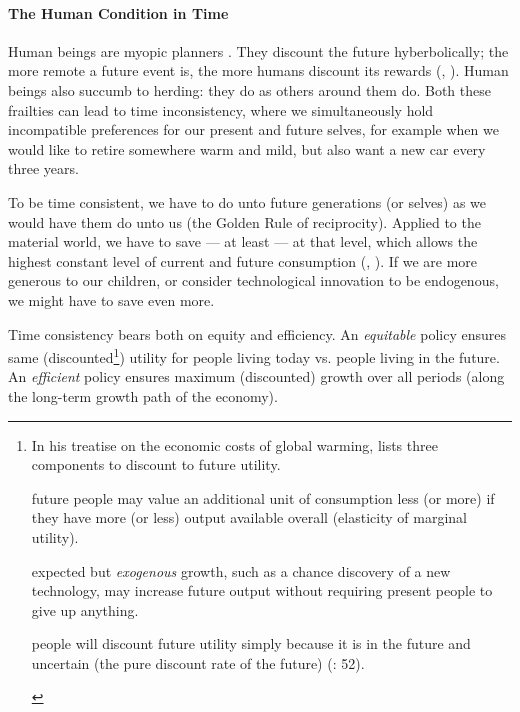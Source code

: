 \paragraph{The Human Condition in Time}
Human beings are myopic planners \citep{KahnemanTversky1979}. They discount the future hyberbolically; the more remote a future event is, the more humans discount its rewards (\citealt{Ainslie1975}, \citealt{Thaler1981}). Human beings also succumb to herding: they do as others around them do. %
Both these frailties can lead to time inconsistency, where we simultaneously hold incompatible preferences for our present and future selves, for example when we would like to retire somewhere warm and mild, but also want a new car every three years.

To be time consistent, we have to do unto future generations (or selves) as we would have them do unto us (the Golden Rule of reciprocity). Applied to the material world, we have to save --- at least --- at that level, which allows the highest constant level of current and future consumption (\citealt{Phelps1966a}, \citealt{Solow1956}). If we are more generous to our children, or consider technological innovation to be endogenous, we might have to save even more.

Time consistency bears both on equity and efficiency. An \emph{equitable} policy ensures same (discounted\footnote{
	\label{fn:3components} In his treatise on the economic costs of global warming, \citeauthor{Stern-2006-aa} lists three components to discount to future utility. \begin{inparaenum}[\itshape 1\upshape)] 
		\item future people may value an additional unit of consumption less (or more) if they have more (or less) output available overall (elasticity of marginal utility). 
		\item expected but \emph{exogenous} growth, such as a chance discovery of a new technology, may increase future output without requiring present people to give up anything. 
		\item people will discount future utility simply because it is in the future and uncertain (the pure discount rate of the future) (\citeyear{Stern-2006-aa}: 52).
	\end{inparaenum}})
utility for people living today vs. people living in the future. An \emph{efficient} policy ensures maximum (discounted) growth over all periods (along the long-term growth path of the economy). %


